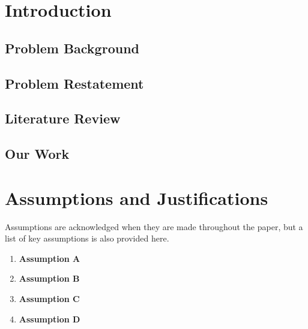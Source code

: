 \documentclass[12pt]{article}
\begin{document}
\section{\textbf{Introduction}}
\subsection{\textbf{Problem Background}}

\subsection{\textbf{Problem Restatement}}

\subsection{\textbf{Literature Review}}

\subsection{\textbf{Our Work}}


\section{\textbf{Assumptions and Justifications}}

Assumptions are acknowledged when they are made throughout the paper, but a list of key assumptions is also provided here.

\begin{enumerate}
    \item \textbf{Assumption A} 
    \item \textbf{Assumption B}  
    \item \textbf{Assumption C}   
    \item \textbf{Assumption D}
\end{enumerate}


\end{document}
